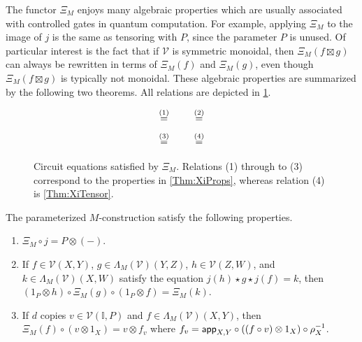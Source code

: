 The functor $\Xi_M$ enjoys many algebraic properties which are usually associated with controlled gates in quantum computation.
For example, applying $\Xi_M$ to the image of $j$ is the same as tensoring with $P$, since the parameter $P$ is unused.
Of particular interest is the fact that if $\mathcal{V}$ is symmetric monoidal, then $\Xi_M( f \boxtimes g )$ can always be rewritten in terms of $\Xi_M( f )$ and $\Xi_M( g )$, even though $\Xi_M( f \boxtimes g )$ is typically not monoidal.
These algebraic properties are summarized by the following two theorems.
All relations are depicted in \cref{Fig:XiCircs}.

\begin{figure}[t]
    \begin{equation*}
        \scalebox{0.73}{}
        \overset{(1)}{=}
        \scalebox{0.73}{}
        \qquad
        \scalebox{0.77}{}
        \overset{(2)}{=}
        \scalebox{0.73}{}
    \end{equation*}
    \begin{equation*}
        \scalebox{0.73}{}
        \overset{(3)}{=}
        \scalebox{0.73}{}
        \qquad
        \scalebox{0.73}{}
        \overset{(4)}{=}
        \scalebox{0.73}{}
    \end{equation*}
    \caption{Circuit equations satisfied by $\Xi_M$. Relations (1) through to (3) correspond to the properties in \cref{Thm:XiProps}, whereas relation (4) is \cref{Thm:XiTensor}.}
    \label{Fig:XiCircs}
\end{figure}

\begin{thm}
    \label{Thm:XiProps}
    The parameterized $M$-construction satisfy the following properties.
    \begin{enumerate}
    \item $\Xi_M \circ j = P \otimes ( - )$.
    \item If $f \in \mathcal{V}( X, Y )$, $g \in \Lambda_M( \mathcal{V} )( Y, Z )$, $h \in \mathcal{V}( Z, W )$, and $k \in \Lambda_M( \mathcal{V} )( X, W )$ satisfy the equation $j( h ) \star g \star j( f ) = k$, then $( 1_P \otimes h ) \circ \Xi_M( g ) \circ ( 1_P \otimes f ) = \Xi_M( k )$.
    \item If $d$ copies $v \in \mathcal{V}( \mathbb{I}, P )$ and $f \in \Lambda_M( \mathcal{V} )( X, Y )$, then $\Xi_M( f ) \circ ( v \otimes 1_X ) = v \otimes f_v$ where $f_v = \mathsf{app}_{X,Y} \circ ( ( f \circ v ) \otimes 1_X ) \circ \rho_X^{-1}$.
    \end{enumerate}
\end{thm}

